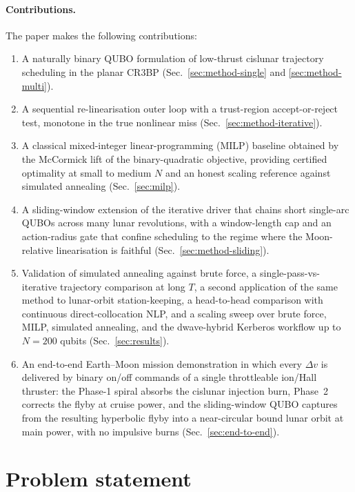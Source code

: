 \documentclass[11pt,a4paper]{article}
\theoremstyle{plain}
\begin{document}
\paragraph{Contributions.} The paper makes the following
contributions:
\begin{enumerate}[leftmargin=1.5em, itemsep=2pt]
  \item A naturally binary QUBO formulation of low-thrust cislunar
    trajectory scheduling in the planar CR3BP (Sec.~\ref{sec:method-single} and \ref{sec:method-multi}).
  \item A sequential re-linearisation outer loop with a
    trust-region accept-or-reject test, monotone in the true
    nonlinear miss (Sec.~\ref{sec:method-iterative}).
  \item A classical mixed-integer linear-programming (MILP) baseline
    obtained by the McCormick lift of the binary-quadratic
    objective, providing certified optimality at small to medium
    $N$ and an honest scaling reference against simulated annealing
    (Sec.~\ref{sec:milp}).
  \item A sliding-window extension of the iterative driver that
    chains short single-arc QUBOs across many lunar revolutions,
    with a window-length cap and an action-radius gate that
    confine scheduling to the regime where the Moon-relative
    linearisation is faithful
    (Sec.~\ref{sec:method-sliding}).
  \item Validation of simulated annealing against brute force,
    a single-pass-vs-iterative trajectory comparison at long $T$,
    a second application of the same method to lunar-orbit
    station-keeping, a head-to-head comparison with continuous
    direct-collocation NLP, and a scaling sweep over brute force,
    MILP, simulated annealing, and the dwave-hybrid Kerberos
    workflow up to $N = 200$ qubits (Sec.~\ref{sec:results}).
  \item An end-to-end Earth--Moon mission demonstration in which
    every $\Delta v$ is delivered by binary on/off commands of a
    single throttleable ion/Hall thruster: the Phase-1 spiral
    absorbs the cislunar injection burn, Phase~2 corrects the
    flyby at cruise power, and the sliding-window QUBO captures
    from the resulting hyperbolic flyby into a near-circular
    bound lunar orbit at main power, with no impulsive burns
    (Sec.~\ref{sec:end-to-end}).
\end{enumerate}

\section{Problem statement}\label{sec:problem}
\end{document}
